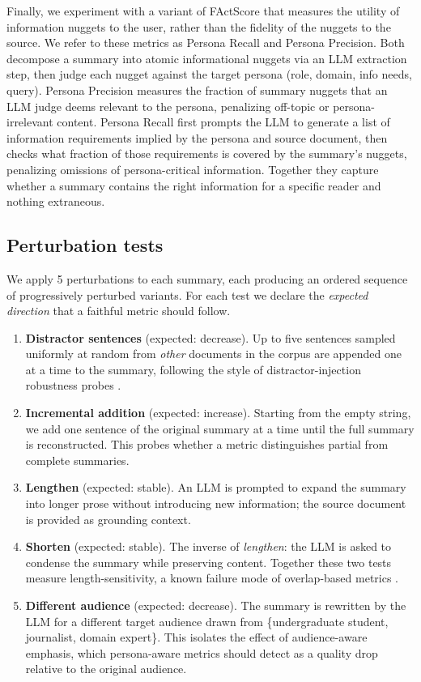 Finally, we experiment with a variant of FActScore that measures the utility of information nuggets to the user, rather than the fidelity of the nuggets to the source. We refer to these metrics as Persona Recall and Persona Precision.
 Both decompose a summary into atomic informational nuggets via an LLM extraction step, then judge each nugget against the target persona (role, domain, info needs, query). Persona Precision measures the fraction of summary nuggets that an LLM judge deems relevant to the persona, penalizing off-topic or persona-irrelevant content. Persona Recall first prompts the LLM to generate a list of information requirements implied by the persona and source document, then checks what fraction of those requirements is covered by the summary's nuggets, penalizing omissions of persona-critical information. Together they capture whether a summary contains the right information for a specific reader and nothing extraneous.


\subsection{Perturbation tests}
\label{sec:perturbations}

We apply 5 perturbations to each summary, each producing an ordered
sequence of progressively perturbed variants. For each test we declare
the \emph{expected direction} that a faithful metric should follow.

\begin{enumerate}
    \item \textbf{Distractor sentences} (expected: decrease). Up to five
    sentences sampled uniformly at random from \emph{other} documents in
    the corpus are appended one at a time to the summary, following the
    style of distractor-injection robustness probes
    \cite{kryscinski2019neural,gabriel2021goyfaithful}.
    \item \textbf{Incremental addition} (expected: increase). Starting
    from the empty string, we add one sentence of the original summary
    at a time until the full summary is reconstructed. This probes
    whether a metric distinguishes partial from complete summaries.
    \item \textbf{Lengthen} (expected: stable). An LLM is prompted to
    expand the summary into longer prose without introducing new
    information; the source document is provided as grounding context.
    \item \textbf{Shorten} (expected: stable). The inverse of
    \emph{lengthen}: the LLM is asked to condense the summary while
    preserving content. Together these two tests measure
    length-sensitivity, a known failure mode of overlap-based metrics
    \cite{sun2019compare}.
    \item \textbf{Different audience} (expected: decrease). The summary
    is rewritten by the LLM for a different target audience drawn from
    \{undergraduate student, journalist, domain expert\}. This isolates
    the effect of audience-aware emphasis, which persona-aware metrics
    should detect as a quality drop relative to the original audience.
\end{enumerate}

